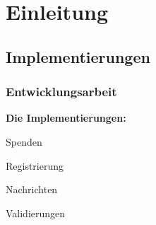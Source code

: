 \section{Einleitung} %
\subsection{Implementierungen}
\begin{frame} %
  \frametitle{Entwicklungsarbeit} %

\textbf{Die Implementierungen:}
\bigskip

  \begin{itemize}
    \begin{multicols}{2}
      \item Spenden
      \item Registrierung
      \item Nachrichten
      \item Validierungen
    \end{multicols}
  \end{itemize}

\end{frame}
